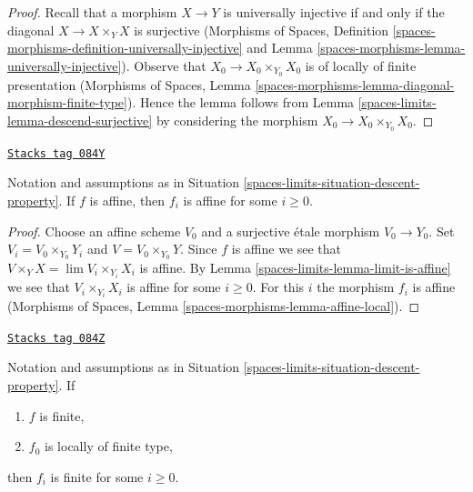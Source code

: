 \begin{proof}
Recall that a morphism $X \to Y$ is universally injective if and
only if the diagonal $X \to X \times_Y X$ is surjective
(Morphisms of Spaces, Definition
\ref{spaces-morphisms-definition-universally-injective} and
Lemma \ref{spaces-morphisms-lemma-universally-injective}).
Observe that $X_0 \to X_0 \times_{Y_0} X_0$ is of locally of finite
presentation (Morphisms of Spaces, Lemma
\ref{spaces-morphisms-lemma-diagonal-morphism-finite-type}).
Hence the lemma follows from Lemma \ref{spaces-limits-lemma-descend-surjective}
by considering the morphism $X_0 \to X_0 \times_{Y_0} X_0$.
\end{proof}

\begin{lemma}
\label{spaces-limits-lemma-descend-affine}
\href{https://stacks.math.columbia.edu/tag/084Y}{\texttt{Stacks tag 084Y}}

Notation and assumptions as in Situation \ref{spaces-limits-situation-descent-property}. If
$f$ is affine, then $f_i$ is affine for some $i \geq 0$.
\end{lemma}

\begin{proof}
Choose an affine scheme $V_0$ and a surjective \'etale morphism $V_0 \to Y_0$.
Set $V_i = V_0 \times_{Y_0} Y_i$ and $V = V_0 \times_{Y_0} Y$.
Since $f$ is affine we see that $V \times_Y X = \lim V_i \times_{Y_i} X_i$
is affine. By Lemma \ref{spaces-limits-lemma-limit-is-affine} we see that
$V_i \times_{Y_i} X_i$ is affine for some $i \geq 0$. For this $i$ the morphism
$f_i$ is affine
(Morphisms of Spaces, Lemma \ref{spaces-morphisms-lemma-affine-local}).
\end{proof}

\begin{lemma}
\label{spaces-limits-lemma-descend-finite}
\href{https://stacks.math.columbia.edu/tag/084Z}{\texttt{Stacks tag 084Z}}

Notation and assumptions as in Situation \ref{spaces-limits-situation-descent-property}. If
\begin{enumerate}
\item $f$ is finite,
\item $f_0$ is locally of finite type,
\end{enumerate}
then $f_i$ is finite for some $i \geq 0$.
\end{lemma}

